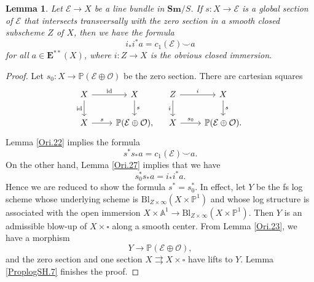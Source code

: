 \documentclass[11pt, a4paper]{amsart}
\newtheorem{lem}[thm]{Lemma}
\theoremstyle{definition}
\numberwithin{equation}{subsection}
\renewcommand{\P}{\mathbb{P}}
\newcommand{\A}{\mathbb{A}}
\newcommand{\Sm}{\mathbf{Sm}}
\newcommand{\id}{\operatorname{id}}   			%
\newcommand{\Blow}{{\mathrm{Bl}}}
\newcommand{\cE}{\mathcal{E}}
\newcommand{\cO}{\mathcal{O}}
\newcommand{\boxx}{\square}
\newcommand{\ringE}{\mathbf{E}}
\begin{document}
\begin{lem}
\label{Ori.24}
Let $\cE\to X$ be a line bundle in $\Sm/S$.
If $s\colon X\to \cE$ is a global section of $\cE$ that intersects transversally 
with the zero section in a smooth closed subscheme $Z$ of $X$, 
then we have the formula
\[
i_*i^*a=c_1(\cE)\smile a
\]
for all $a\in \ringE^{**}(X)$, where $i\colon Z\to X$ is the obvious closed immersion.
\end{lem}
\begin{proof}
Let $s_0\colon X\to \P(\cE\oplus \cO)$ be the zero section.
There are cartesian squares
\[
\begin{tikzcd}
X\ar[r,"\id"]\ar[d,"\id"']&
X\ar[d,"s"]
\\
X\ar[r,"s"]&\P(\cE\oplus \cO),
\end{tikzcd}
\quad
\begin{tikzcd}
Z\ar[r,"i"]\ar[d,"i"']&
X\ar[d,"s"]
\\
X\ar[r,"s_0"]&\P(\cE\oplus \cO).
\end{tikzcd}
\]
Lemma \ref{Ori.22} implies the formula
\[
s^*s_* a = c_1(\cE)\smile a.
\]
On the other hand, Lemma \ref{Ori.27} implies that we have
\[
s_0^*s_* a= i_*i^*a.
\]
Hence we are reduced to show the formula $s^*=s_0^*$.
In effect, 
let $Y$ be the fs log scheme whose underlying scheme is $\Blow_{Z\times \infty}(X\times \P^1)$ and whose log structure is associated with the open immersion $X\times \A^1\to \Blow_{Z\times \infty}(X\times \P^1)$.
Then $Y$ is an admissible blow-up of $X\times \boxx$ along a smooth center.
From Lemma \ref{Ori.23}, we have a morphism
\[
Y\to \P(\cE\oplus \cO),
\]
and the zero section and one section $X\rightrightarrows X\times \boxx$ have lifts to $Y$.
Lemma \ref{ProplogSH.7} finishes the proof.
\end{proof}
\end{document}
